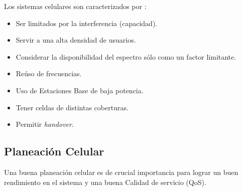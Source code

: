 Los sistemas celulares son caracterizados por \parencite{Correia2018}:
\begin{itemize}
    \item Ser limitados por la interferencia (capacidad).
    \item Servir a una alta densidad de usuarios.
    \item Considerar la disponibilidad del espectro sólo como un factor limitante.
    \item Reúso de frecuencias.
    \item Uso de Estaciones Base de baja potencia.
    \item Tener celdas de distintas coberturas.
    \item Permitir \textit{handover}.
\end{itemize}

\subsection{Planeación Celular}

Una buena planeación celular es de crucial importancia para lograr un buen rendimiento en el sistema y una buena Calidad de servicio (QoS).\newline

